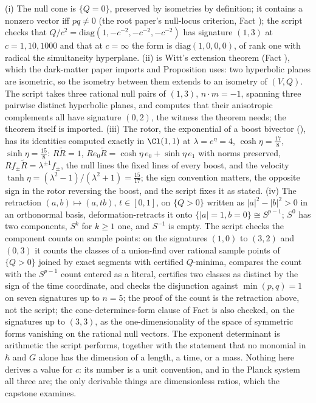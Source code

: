(i) The null cone is $\{Q = 0\}$, preserved by isometries by definition; it contains a nonzero vector iff $pq \neq 0$ (the root paper's null-locus criterion, Fact ); the script checks that $Q/c^{2} = \mathrm{diag}(1, -c^{-2}, -c^{-2}, -c^{-2})$ has signature $(1,3)$ at $c = 1, 10, 1000$ and that at $c = \infty$ the form is $\mathrm{diag}(1, 0, 0, 0)$, of rank one with radical the simultaneity hyperplane. (ii) is Witt's extension theorem (Fact ), which the dark-matter paper imports and Proposition  uses: two hyperbolic planes are isometric, so the isometry between them extends to an isometry of $(V, Q)$. The script takes three rational null pairs of $(1,3)$, $n \cdot m = -1$, spanning three pairwise distinct hyperbolic planes, and computes that their anisotropic complements all have signature $(0,2)$, the witness the theorem needs; the theorem itself is imported. (iii) The rotor, the exponential of a boost bivector (), has its identities computed exactly in $\Cl(1,1)$ at $\lambda = e^{\eta} = 4$, $\cosh\eta = \tfrac{17}{8}$, $\sinh\eta = \tfrac{15}{8}$: $R\tilde{R} = 1$, $Re_{0}\tilde{R} = \cosh\eta\,e_{0} + \sinh\eta\,e_{1}$ with norms preserved, $Rf_{\pm}\tilde{R} = \lambda^{\pm 1}f_{\pm}$, the null lines the fixed lines of every boost, and the velocity $\tanh\eta = (\lambda^{2} - 1)/(\lambda^{2} + 1) = \tfrac{15}{17}$; the sign convention matters, the opposite sign in the rotor reversing the boost, and the script fixes it as stated. (iv) The retraction $(a, b) \mapsto (a, tb)$, $t \in [0, 1]$, on $\{Q > 0\}$ written as $|a|^{2} - |b|^{2} > 0$ in an orthonormal basis, deformation-retracts it onto $\{|a| = 1, b = 0\} \cong S^{p-1}$; $S^{0}$ has two components, $S^{k}$ for $k \geq 1$ one, and $S^{-1}$ is empty. The script checks the component counts on sample points: on the signatures $(1,0)$ to $(3,2)$ and $(0,3)$ it counts the classes of a union-find over rational sample points of $\{Q > 0\}$ joined by exact segments with certified $Q$-minima, compares the count with the $S^{p-1}$ count entered as a literal, certifies two classes as distinct by the sign of the time coordinate, and checks the disjunction against $\min(p, q) = 1$ on seven signatures up to $n = 5$; the proof of the count is the retraction above, not the script; the cone-determines-form clause of Fact  is also checked, on the signatures up to $(3,3)$, as the one-dimensionality of the space of symmetric forms vanishing on the rational null vectors. The exponent determinant is arithmetic the script performs, together with the statement that no monomial in $\hbar$ and $G$ alone has the dimension of a length, a time, or a mass. Nothing here derives a value for $c$: its number is a unit convention, and in the Planck system all three are; the only derivable things are dimensionless ratios, which the capstone examines.
